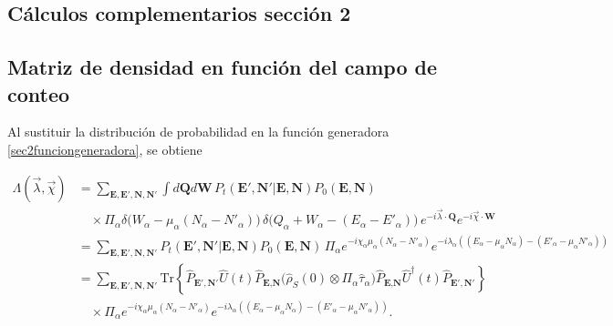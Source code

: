 \begin{appendixs}
	
	\section{Cálculos complementarios sección 2}

    \subsection{Matriz de densidad en función del campo de conteo}
\label{apendix:fcs1}

Al sustituir la distribución de probabilidad en la función generadora \eqref{sec2funciongeneradora}, se obtiene

\begin{align*}
    \Lambda(\vec{\lambda},\vec{\chi}) & = \sum_{\textbf{E},\textbf{E}',\textbf{N},\textbf{N}'} \int d\textbf{Q}d\textbf{W}\, P_{t}(\textbf{E}',\textbf{N}'|\textbf{E},\textbf{N}) P_{0}(\textbf{E},\textbf{N})  \\
    & \quad \times \Pi_{\alpha} \delta\!\big(W_{\alpha} - \mu_{\alpha}(N_{\alpha} - N'_{\alpha})\big) \,
      \delta\!\big(Q_{\alpha} + W_{\alpha} -(E_{\alpha} - E'_{\alpha})\big)\,
      e^{-i\vec{\lambda}\cdot \textbf{Q}} e^{-i\vec{\chi}\cdot \textbf{W}} \\
    & = \sum_{\textbf{E},\textbf{E}',\textbf{N},\textbf{N}'} P_{t}(\textbf{E}',\textbf{N}'|\textbf{E},\textbf{N}) P_{0}(\textbf{E},\textbf{N})\, 
        \Pi_{\alpha} e^{-i\chi_{\alpha}\mu_{\alpha}(N_{\alpha} - N'_{\alpha})}
        e^{-i\lambda_{\alpha}((E_{\alpha} -\mu_{\alpha}N_{\alpha}) - (E'_{\alpha} - \mu_{\alpha}N'_{\alpha})) }  \\
    & = \sum_{\textbf{E},\textbf{E}',\textbf{N},\textbf{N}'} \mathrm{Tr}\!\left\{\hat{P}_{\textbf{E}',\textbf{N}'}\hat{U}(t)\hat{P}_{\textbf{E},\textbf{N}}\big(\hat{\rho}_{S}(0)\otimes \Pi_{\alpha}\hat{\tau}_{\alpha}\big)\hat{P}_{\textbf{E},\textbf{N}}\hat{U}^{\dagger}(t)\hat{P}_{\textbf{E}',\textbf{N}'}\right\} \\
    & \quad \times \Pi_{\alpha} e^{-i\chi_{\alpha}\mu_{\alpha}(N_{\alpha} - N'_{\alpha})}
        e^{-i\lambda_{\alpha}((E_{\alpha} -\mu_{\alpha}N_{\alpha}) - (E'_{\alpha} - \mu_{\alpha}N'_{\alpha})) }.
\end{align*}


\end{appendixs}
